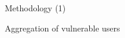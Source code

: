 \documentclass{beamer}
\begin{document}
\begin{frame}{Methodology (1)}
\begin{block}{Aggregation of vulnerable users}
\begin{itemize}

		\end{itemize}
	\end{block}
\end{frame}
\end{document}
